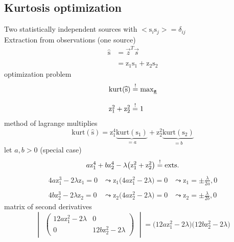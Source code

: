 \subsection{Kurtosis optimization}
Two statistically independent sources with $\big< \mathrm{s}_i \mathrm{s}_j \big> = \delta_{ij}$\\
Extraction from observations (one source)
\begin{equation}
	\begin{array}{ll}
	\widehat{\mathrm{s}} & = \vec{z}^T \vec{s}  \\\\
	& = \mathrm{z}_1 \mathrm{s}_1 + \mathrm{z}_2 \mathrm{s}_2
	\end{array}
\end{equation}
optimization problem
\begin{equation}
	\begin{array}{l}
	\mathrm{kurt}(\widehat{\mathrm{s}}) \stackrel{\mathrm{!}}{=} \max_{\underline{\mathbf{z}}} \\\\
	\mathrm{z}^2_1 + \mathrm{z}^2_2 \stackrel{\mathrm{!}}{=} 1
	\end{array}
\end{equation}
method of lagrange multiplies
\begin{equation}
	\mathrm{kurt}(\widehat{\mathrm{s}}) = \mathrm{z}^4_1 
		\underbrace{\mathrm{kurt}(\mathrm{s}_1)}_{= a}
		+ \mathrm{z}^2_2 \underbrace{\mathrm{kurt}(\mathrm{s}_2)}_{
			= b}
\end{equation}
let $a, b > 0$ (special case)
\begin{equation}
	a\mathrm{z}^4_1 + b\mathrm{z}^4_2 - \lambda \big(\mathrm{z}^2_1 
		+ \mathrm{z}^2_2\big) \stackrel{\mathrm{!}}{=} \mathrm{exts.} 
\end{equation}
\begin{equation}
	\begin{array}{lll}
	4a\mathrm{z}^3_1 - 2\lambda\mathrm{z}_1 = 0
		& \leadsto \mathrm{z}_1 \big(4a\mathrm{z}^2_1 - 2\lambda
			\big) = 0
		& \leadsto \mathrm{z}_1 = \pm \frac{\lambda}{2a}, 0 \\\\
	4b\mathrm{z}^3_2 - 2\lambda\mathrm{z}_2 = 0
		& \leadsto \mathrm{z}_2 \big(4a\mathrm{z}^2_2 - 2\lambda
			\big) = 0
		& \leadsto \mathrm{z}_2 = \pm \frac{\lambda}{2b}, 0
	\end{array}
\end{equation}
matrix of second derivatives
\begin{equation}
	\begin{vmatrix} \begin{pmatrix} 
		12a\mathrm{z}^2_1 - 2\lambda & 0 \\
		0 & 12b\mathrm{z}^2_2 - 2\lambda
	\end{pmatrix} \end{vmatrix}
	= \big(12a\mathrm{z}^2_1 - 2\lambda\big)
		\big(12b\mathrm{z}^2_2 - 2\lambda\big)
\end{equation}
